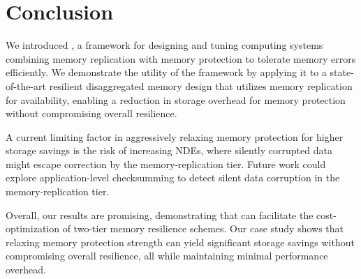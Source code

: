 \section{Conclusion}
We introduced \ramp, a framework for designing and tuning computing systems combining memory replication with memory protection to tolerate memory errors efficiently.
We demonstrate the utility of the \ramp framework by applying it to a state-of-the-art resilient disaggregated memory design that utilizes memory replication for availability, enabling a reduction in storage overhead for memory protection without compromising overall resilience.

A current limiting factor in aggressively relaxing memory protection for higher storage savings is the risk of increasing NDEs, where silently corrupted data might escape correction by the memory-replication tier. Future work could explore application-level checksumming to detect silent data corruption in the memory-replication tier. 



Overall, our results are promising, demonstrating that \ramp can facilitate the cost-optimization of two-tier memory resilience schemes. Our case study shows that relaxing memory protection strength can yield significant storage savings without compromising overall resilience, all while maintaining minimal performance overhead.


